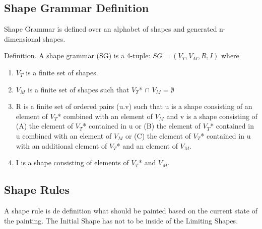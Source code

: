 \documentclass[11pt, a4paper]{report}
\begin{document}
\subsection{Shape Grammar Definition}
\label{sec:Shape_Grammar_Definition}
Shape Grammar is defined over an alphabet of shapes and generated n-dimensional shapes\citep{shapeGrammars:1972}.
\begin{displayquote} 
    Definition. A shape grammar (SG) is a 4-tuple: $SG = (V_T, V_M, R, I)$ where
    \begin{enumerate}
        \item $V_T$ is a finite set of shapes.
        \item $V_M$ is a finite set of shapes such that $V_T $* $\cap$  $V_M = \emptyset$
        \item R is a finite set of ordered pairs (u.v) such that u is a shape consisting of an element of $V_T $* combined with an element of $V_M$ and v is a shape consisting of (A) the element of $V_T $* contained in u or (B) the element of $V_T $* contained in u combined with an element of $V_M$ or (C) the element of $V_T $* contained in u with an additional element of $V_T$* and an element of $V_M$.
        \item I is a shape consisting of elements of $V_T $* and $V_M$.
    \end{enumerate}
\end{displayquote}


\subsection{Shape Rules}
\label{sec:Shape_Grammar_Shape_Rules}
A shape rule is de definition what should be painted based on the current state of the painting. The Initial Shape has not to be inside of the Limiting Shapes.
\end{document}
